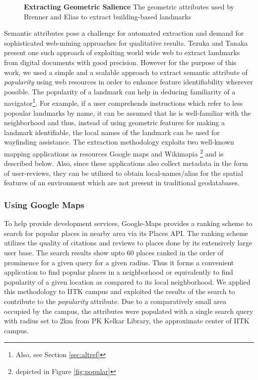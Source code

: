 \documentclass{iitkthesis}
\begin{document}
\begin{figure}
\centering
{}
\caption{\textbf{Extracting Geometric Salience} The geometric attributes used by Brenner and Elias \cite{brenner} to extract building-based landmarks}
\label{fig:elias}
 \end{figure}

Semantic attributes pose a challenge for automated extraction and demand for sophisticated web-mining approaches for qualitative results. Tezuka and Tanaka \cite{tezuka} present one such approach of exploiting world wide web to extract landmarks from digital documents with good precision. However for the purpose of this work, we used a simple and a scalable approach to extract semantic attribute of \textit{popularity} using web resources in order to enhance feature identifiability wherever possible. The popularity of a landmark can help in deducing familiarity of a navigator\footnote{Also, see Section \ref{sec:altref}}. For example, if a user comprehends instructions which refer to less popoular landmarks by name, it can be assumed that he is well-familiar with the neighborhood and thus, instead of using geometric features for making a landmark identifiable, the local names of the landmark can be used for wayfinding assistance. The extraction methodology exploits two well-known mapping applications as resources Google maps \cite{gmaps} and Wikimapia \cite{wiki}\footnote{depicted in Figure \ref{fig:popular}} and is described below.  Also, since these applications also collect metadata in the form of user-reviews, they can be utilized to obtain local-names/alias for the spatial features of an environment which are not present in traditional geodatabases.
\subsubsection*{Using Google Maps}
To help provide development services, Google-Maps provides a ranking scheme to search for popular places in nearby area via its Places API. The ranking scheme utilizes the quality of citations and reviews to places done by its extensively large user base. The search results show upto 60 places ranked in the order of prominence for a given query for a given radius. Thus it forms a convenient application to find popular places in a neighborhood or equivalently to find popularity of a given location as compared to its local neighborhood. We applied this methodology to IITK campus and exploited the results of the search to contribute to the \textit{popularity} attribute. Due to a comparatively small area occupied by the campus, the attributes were populated with a single search query with radius set to 2km from PK Kelkar Library, the approximate center of IITK campus.
\end{document}
